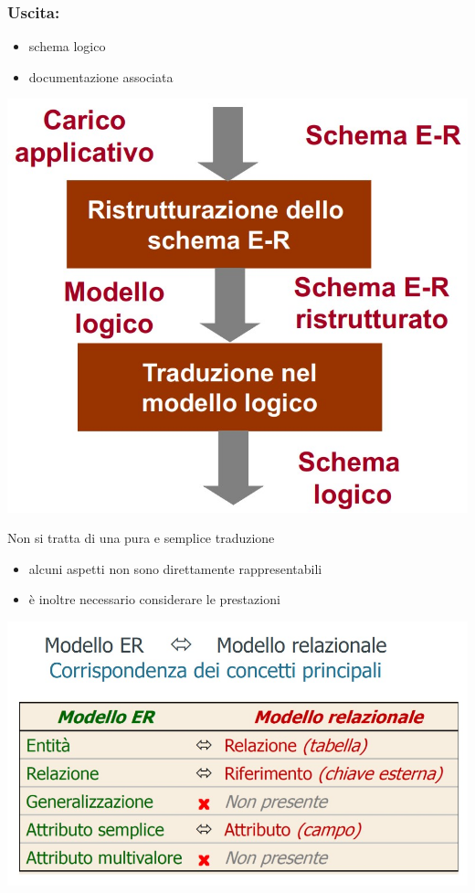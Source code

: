 \subsubsection{Uscita:}
\begin{itemize}
    \item schema logico
    \item documentazione associata
\end{itemize}
\begin{center}
    \includegraphics[scale=0.675]{chaptersLezioniSara/img/PLog_intro2.jpg}
\end{center}
Non si tratta di una pura e semplice traduzione
\begin{itemize}
    \item alcuni aspetti non sono direttamente rappresentabili
    \item è inoltre necessario considerare le prestazioni
\end{itemize}
\begin{center}
    \includegraphics[scale=0.675]{chaptersLezioniSara/img/PLog_intro3.jpg}
\end{center}

